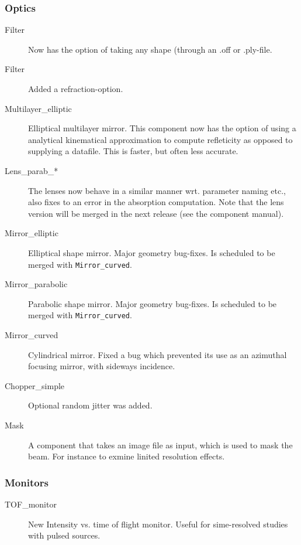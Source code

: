 \subsubsection*{Optics}
\begin{description}
  \item[Filter] Now has the option of taking any shape (through an .off or .ply-file.
  \item[Filter] Added a refraction-option. 
  \item[Multilayer\_elliptic] Elliptical multilayer mirror. This component now has the option of using a analytical kinematical approximation to compute refleticity as opposed to supplying a datafile. This is faster, but often less accurate.
  \item[Lens\_parab\_*] The lenses now behave in a similar manner wrt. parameter naming etc., also fixes to an error in the absorption computation. Note that the lens version will be merged in the next release (see the component manual).
  \item[Mirror\_elliptic] Elliptical shape mirror. Major geometry bug-fixes. Is scheduled to be merged with \texttt{Mirror\_curved}.
  \item[Mirror\_parabolic] Parabolic shape mirror. Major geometry bug-fixes. Is scheduled to be merged with \texttt{Mirror\_curved}.
  \item[Mirror\_curved] Cylindrical mirror. Fixed a bug which prevented its use as an azimuthal focusing mirror, with sideways incidence. 
  \item [Chopper\_simple] Optional random jitter was added.
  \item [Mask] A component that takes an image file as input, which is used to mask the beam. For instance to exmine linited resolution effects.
\end{description}


\subsubsection*{Monitors}
\begin{description}
\item[TOF\_monitor] New Intensity vs. time of flight monitor. Useful for sime-resolved studies with pulsed sources.
\end{description}


